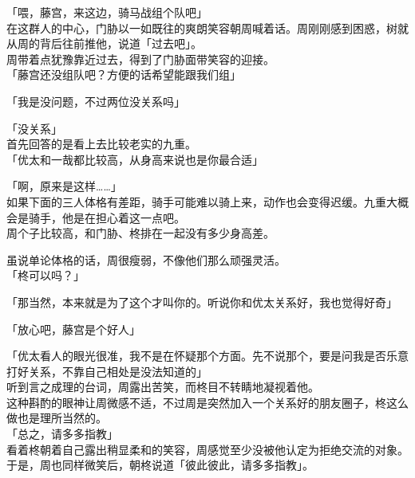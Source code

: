 「喂，藤宫，来这边，骑马战组个队吧」\\

在这群人的中心，门胁以一如既往的爽朗笑容朝周喊着话。周刚刚感到困惑，树就从周的背后往前推他，说道「过去吧」。\\

周带着点犹豫靠近过去，得到了门胁面带笑容的迎接。\\

「藤宫还没组队吧？方便的话希望能跟我们组」

「我是没问题，不过两位没关系吗」

「没关系」\\

首先回答的是看上去比较老实的九重。\\

「优太和一哉都比较高，从身高来说也是你最合适」

「啊，原来是这样……」\\

如果下面的三人体格有差距，骑手可能难以骑上来，动作也会变得迟缓。九重大概会是骑手，他是在担心着这一点吧。\\

周个子比较高，和门胁、柊排在一起没有多少身高差。

虽说单论体格的话，周很瘦弱，不像他们那么顽强灵活。\\

「柊可以吗？」

「那当然，本来就是为了这个才叫你的。听说你和优太关系好，我也觉得好奇」

「放心吧，藤宫是个好人」

「优太看人的眼光很准，我不是在怀疑那个方面。先不说那个，要是问我是否乐意打好关系，不靠自己相处是没法知道的」\\

听到言之成理的台词，周露出苦笑，而柊目不转睛地凝视着他。\\

这种斟酌的眼神让周微感不适，不过周是突然加入一个关系好的朋友圈子，柊这么做也是理所当然的。\\

「总之，请多多指教」\\

看着柊朝着自己露出稍显柔和的笑容，周感觉至少没被他认定为拒绝交流的对象。于是，周也同样微笑后，朝柊说道「彼此彼此，请多多指教」。
